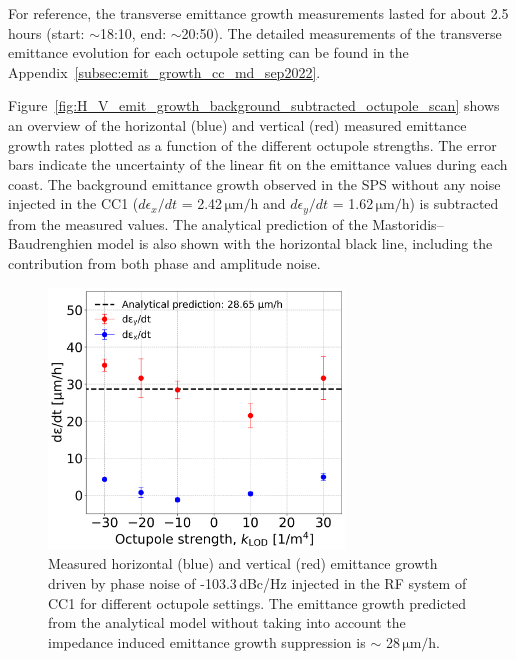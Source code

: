 For reference, the transverse emittance growth measurements lasted for about 2.5\,hours (start: $\sim$18:10, end: $\sim$20:50). The detailed measurements of the transverse emittance evolution for each octupole setting can be found in the Appendix~\ref{subsec:emit_growth_cc_md_sep2022}. 

Figure~\ref{fig:H_V_emit_growth_background_subtracted_octupole_scan} shows an overview of the horizontal (blue) and vertical (red) measured emittance growth rates plotted as a function of the different octupole strengths. The error bars indicate the uncertainty of the linear fit on the emittance values during each coast. The background emittance growth observed in the SPS without any noise injected in the CC1 ($d\epsilon_x/dt$ = 2.42\,$\mathrm{\mu m/h}$ and $d\epsilon_y/dt$ = 1.62\,$\mathrm{\mu m/h}$) is subtracted from the measured values. The analytical prediction of the Mastoridis--Baudrenghien model is also shown with the horizontal black line, including the contribution from both phase and amplitude noise.

\begin{figure}[!h]
   \centering         
   \includegraphics[width=0.7\textwidth]{images/Ch8/emit_H_and_V_octupole_scan_background_growth_subtracted_exp3_sep22.png}
       \caption{Measured horizontal (blue) and vertical (red) emittance growth driven by phase noise of -103.3\,dBc/Hz injected in the RF system of CC1 for different octupole settings. The emittance growth predicted from the analytical model without taking into account the impedance induced emittance growth suppression is $\sim$ 28\,$\mathrm{\mu m/h}$.}
       \label{fig:H_V_emit_growth_background_subtracted_octupole_scan_sep22}
\end{figure}

